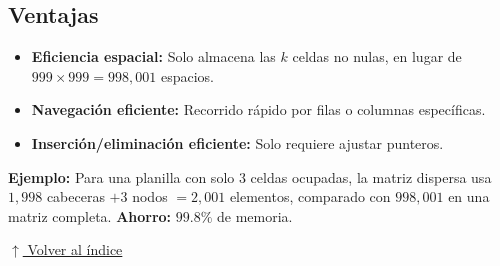 \documentclass[12pt]{article}
\newcommand{\volverindice}{%
    \vspace{1em}%
    \begin{flushright}%
        \hyperlink{indice}{\small $\uparrow$ Volver al índice}%
    \end{flushright}%
}
\begin{document}
\subsection*{Ventajas}
 
\begin{itemize}
    \item \textbf{Eficiencia espacial:} Solo almacena las $k$ celdas no nulas, en lugar de $999 \times 999 = 998{,}001$ espacios.
    
    \item \textbf{Navegación eficiente:} Recorrido rápido por filas o columnas específicas.
    
    \item \textbf{Inserción/eliminación eficiente:} Solo requiere ajustar punteros.
\end{itemize}
 
\textbf{Ejemplo:} Para una planilla con solo 3 celdas ocupadas, la matriz dispersa usa $1{,}998$ cabeceras $+ 3$ nodos $= 2{,}001$ elementos, comparado con $998{,}001$ en una matriz completa. \textbf{Ahorro:} $99.8\%$ de memoria.
 
\volverindice
\end{document}
